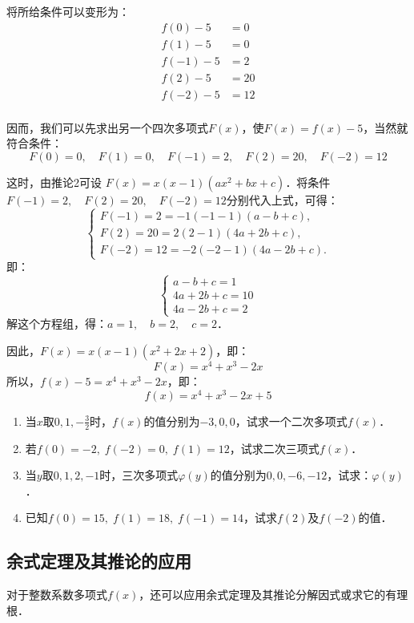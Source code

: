 \begin{solution}
    将所给条件可以变形为：  
\[\begin{split}
    f(0)-5&=0\\
    f(1)-5&=0\\
    f(-1)-5&=2\\
    f(2)-5&=20\\
    f(-2)-5&=12\\
\end{split}\]

因而，我们可以先求出另一个四次多项式$F(x)$，使$F(x)=f(x)-5$，当然就符合条件：
\[F(0)=0,\quad F (1) =0,\quad  F (-1) =2,\quad F (2) =20,\quad  F (-2) =12\]

这时，由推论2可设
$F (x) =x (x-1) (ax^2+bx+c)$．将条件$F(-1)=2,\quad F(2)=20,\quad F(-2)=12$分别代入上式，可得：
\[\begin{cases}
    F (-1) =2=-1 (-1-1) (a-b+c),\\
    F (2) =20=2 (2-1) (4a+2b+c),\\
    F (-2) =12=-2 (-2-1) (4a-2b+c). 
\end{cases}\]
即：\[\begin{cases}
    a-b+c=1\\
4a+2b+c=10\\
4a-2b+c=2
\end{cases}\]
解这个方程组，得：$a=1,\quad b=2,\quad c=2$．

因此，$F(x)=x(x-1)(x^2+2x+2)$，即：
\[F(x)=x^4+x^3-2x\]
所以，$f(x)-5=x^4+x^3-2x$，即：
\[f(x)=x^4+x^3-2x+5\]
\end{solution}

\begin{ex}
\begin{enumerate}
    \item 当$x$取$0,1,-\frac{3}{2}$时，$f(x)$的值分别为$-3,0,0$，试求一个二次多项式$f(x)$．
\item 若$f(0)=-2,\; f(-2)=0,\; f(1)=12$，试求二次三项式$f(x)$．
\item 当$y$取$0, 1, 2,-1$时，三次多项式$\varphi(y)$的值分别为$0, 0,-6,-12$，试求：$\varphi(y)$．
\item 已知$f(0)=15,\; f(1)=18,\; f(-1)=14$，试求$f(2)$及$f(-2)$的值．
\end{enumerate}
\end{ex}

\subsection{余式定理及其推论的应用}
对于整数系数多项式$f(x)$，还可以应用余式定理及其推论分解因式或求它的有理根．


